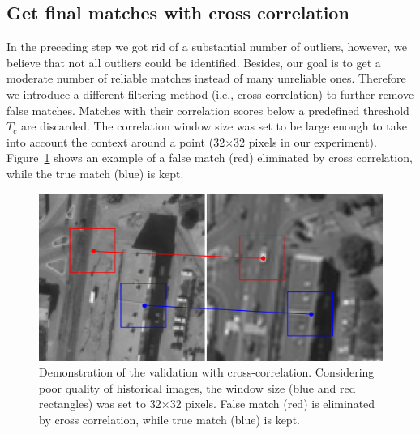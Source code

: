 \subsection{Get final matches with cross correlation}
In the preceding step we got rid of a substantial number of outliers, however, we believe that not all outliers could be identified. 
Besides, our goal is to get a moderate number of reliable matches instead of many unreliable ones. Therefore we introduce a different filtering method (i.e., cross correlation) to further remove false matches.  
Matches with their correlation scores below a predefined threshold $T_c$ are discarded. The correlation window size was set to be large enough to take into account the context around a point (32$\times$32 pixels in our experiment). Figure~\ref{crossc} shows an example of a false match (red) eliminated by cross correlation, while the true match (blue) is kept.\\
\begin{figure}[htbp]
	\begin{center}
		\includegraphics[width=0.8\columnwidth]{images/Chapitre4/tiept.png}
		\caption{Demonstration of the validation with cross-correlation. Considering poor quality of historical images, the window size (blue and red rectangles) was set to 32$\times$32 pixels. False match (red) is eliminated by cross correlation, while true match (blue) is kept.}
		\label{crossc}
	\end{center}
\end{figure}

